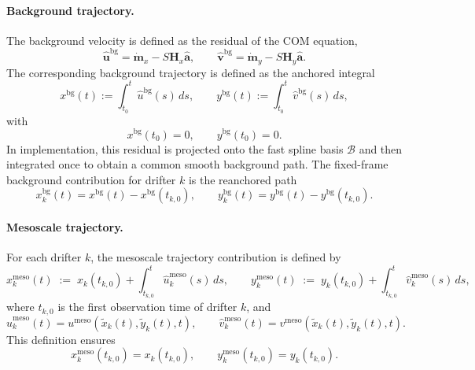 \documentclass{article}
\begin{document}
\paragraph{Background trajectory.}
The background velocity is defined as the residual of the COM equation,
\begin{equation}
\hat{\mathbf{u}}^{\mathrm{bg}}
=
\dot{\mathbf{m}}_x
-
S\mathbf{H}_x\hat{\mathbf a},
\qquad
\hat{\mathbf{v}}^{\mathrm{bg}}
=
\dot{\mathbf{m}}_y
-
S\mathbf{H}_y\hat{\mathbf a}.
\end{equation}
The corresponding background trajectory is defined as the anchored integral
\begin{equation}
x^{\mathrm{bg}}(t) := \int_{t_0}^{t} \hat{u}^{\mathrm{bg}}(s)\,ds,
\qquad
y^{\mathrm{bg}}(t) := \int_{t_0}^{t} \hat{v}^{\mathrm{bg}}(s)\,ds,
\end{equation}
with
\begin{equation}
x^{\mathrm{bg}}(t_0)=0,
\qquad
y^{\mathrm{bg}}(t_0)=0.
\end{equation}
In implementation, this residual is projected onto the fast spline basis
$\mathcal{B}$ and then integrated once to obtain a common smooth background path.
The fixed-frame background contribution for drifter $k$ is the reanchored path
\begin{equation}
x_k^{\mathrm{bg}}(t)=x^{\mathrm{bg}}(t)-x^{\mathrm{bg}}(t_{k,0}),
\qquad
y_k^{\mathrm{bg}}(t)=y^{\mathrm{bg}}(t)-y^{\mathrm{bg}}(t_{k,0}).
\end{equation}

\paragraph{Mesoscale trajectory.}
For each drifter $k$, the mesoscale trajectory contribution is defined by
\begin{equation}
x_k^{\mathrm{meso}}(t)
\;:=\;
x_k(t_{k,0})+\int_{t_{k,0}}^{t}
\hat{u}_k^{\mathrm{meso}}(s)\,ds,
\qquad
y_k^{\mathrm{meso}}(t)
\;:=\;
y_k(t_{k,0})+\int_{t_{k,0}}^{t}
\hat{v}_k^{\mathrm{meso}}(s)\,ds,
\end{equation}
where $t_{k,0}$ is the first observation time of drifter $k$, and
\begin{equation}
\hat{u}_k^{\mathrm{meso}}(t)
=
u^{\mathrm{meso}}(\tilde{x}_k(t),\tilde{y}_k(t),t),
\qquad
\hat{v}_k^{\mathrm{meso}}(t)
=
v^{\mathrm{meso}}(\tilde{x}_k(t),\tilde{y}_k(t),t).
\end{equation}
This definition ensures
\begin{equation}
x_k^{\mathrm{meso}}(t_{k,0})=x_k(t_{k,0}),
\qquad
y_k^{\mathrm{meso}}(t_{k,0})=y_k(t_{k,0}).
\end{equation}
\end{document}

